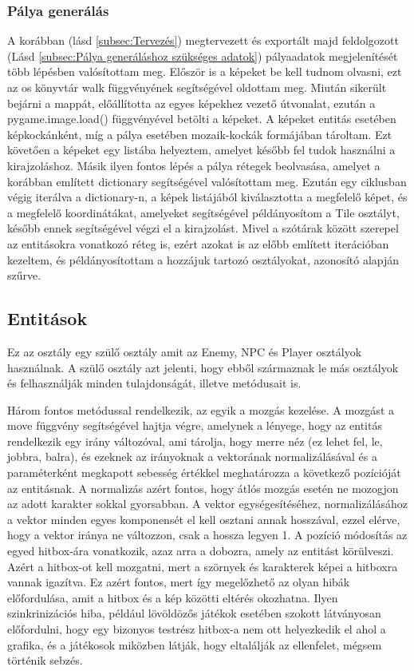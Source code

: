 \subsubsection{Pálya generálás}

 A korábban (lásd \ref{subsec:Tervezés}) megtervezett és exportált majd feldolgozott (Lásd \ref{subsec:Pálya generáláshoz szükséges adatok}) pályaadatok megjelenítését több lépésben valósítottam meg. Először is a képeket be kell tudnom olvasni, ezt az os \cite{Python-os} könyvtár walk függvényének segítségével oldottam meg.
 Miután sikerült bejárni a mappát, előállította az egyes képekhez vezető útvonalat, ezután a pygame.image.load() függvényével betölti a képeket. A képeket entitás esetében képkockánként, míg a pálya esetében mozaik-kockák formájában tároltam.
  Ezt követően a képeket egy listába helyeztem, amelyet később fel tudok használni a kirajzoláshoz.
   Másik ilyen fontos lépés a pálya rétegek beolvasása, amelyet a korábban említett dictionary segítségével valósítottam meg.
    Ezután egy ciklusban végig iterálva a dictionary-n, a képek listájából kiválasztotta a megfelelő képet, és a megfelelő koordinátákat,
     amelyeket segítségével példányosítom a Tile osztályt, később ennek segítségével végzi el a kirajzolást.
      Mivel a szótárak között szerepel az entitásokra vonatkozó réteg is, ezért azokat is az előbb említett iterációban kezeltem,
       és példányosítottam a hozzájuk tartozó osztályokat, azonosító alapján szűrve.

\subsection{Entitások} \label{subsec:Entitások}
 Ez az osztály egy szülő osztály amit az Enemy, NPC és Player osztályok használnak. A szülő osztály azt jelenti, hogy ebből származnak le más osztályok és felhasználják minden tulajdonságát, illetve metódusait is.  

Három fontos metódussal rendelkezik, az egyik a mozgás kezelése. A mozgást a move függvény segítségével hajtja végre, amelynek a lényege, hogy az entitás rendelkezik egy irány változóval, ami tárolja, hogy merre néz (ez lehet fel, le, jobbra, balra), és ezeknek az irányoknak a vektorának normalizálásával és a paraméterként megkapott sebesség értékkel meghatározza a következő pozícióját az entitásnak. A normalizás azért fontos, hogy átlós mozgás esetén ne mozogjon az adott karakter sokkal gyorsabban. A vektor egységesítéséhez, normalizálásához a vektor minden egyes komponensét el kell osztani annak hosszával, ezzel elérve, hogy a vektor iránya ne változzon, csak a hossza legyen 1. A pozíció módosítás az egyed hitbox-ára vonatkozik, azaz arra a dobozra, amely az entitást körülveszi. Azért a hitbox-ot kell mozgatni, mert a szörnyek és karakterek képei a hitboxra vannak igazítva. Ez azért fontos, mert így megelőzhető az olyan hibák előfordulása, amit a hitbox és a kép közötti eltérés okozhatna. Ilyen szinkrinizációs hiba, például lövöldözős játékok esetében szokott látványosan előfordulni, hogy egy bizonyos testrész hitbox-a nem ott helyezkedik el ahol a grafika, és a játékosok miközben látják, hogy eltalálják az ellenfelet, mégsem történik sebzés.

